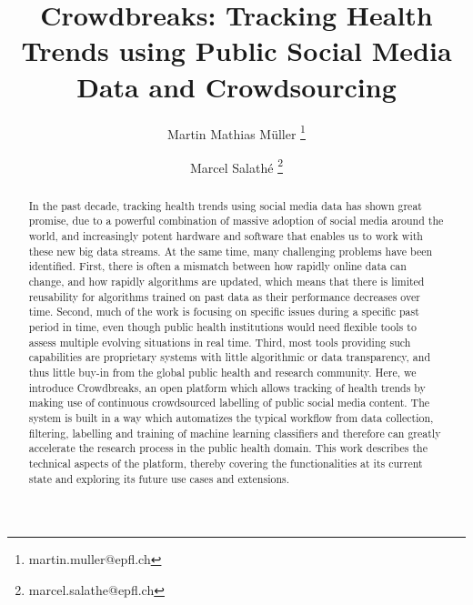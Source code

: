\documentclass[a4paper, 11pt]{article}
\begin{document}
\title{Crowdbreaks: Tracking Health Trends using Public Social Media Data and Crowdsourcing}
\author[1]{Martin Mathias M\"uller \footnote{martin.muller@epfl.ch}}
\author[1]{Marcel Salathé \footnote{marcel.salathe@epfl.ch}}



\maketitle
\linenumbers

\begin{abstract}
  In the past decade, tracking health trends using social media data has shown great promise, due to a powerful combination of massive adoption of social media around the world, and increasingly potent hardware and software that enables us to work with these new big data streams.
  At the same time, many challenging problems have been identified.
  First, there is often a mismatch between how rapidly online data can change, and how rapidly algorithms are updated, which means that there is limited reusability for algorithms trained on past data as their performance decreases over time.
  Second, much of the work is focusing on specific issues during a specific past period in time, even though public health institutions would need flexible tools to assess multiple evolving situations in real time.
  Third, most tools providing such capabilities are proprietary systems with little algorithmic or data transparency, and thus little buy-in from the global public health and research community. 
  Here, we introduce Crowdbreaks, an open platform which allows tracking of health trends by making use of continuous crowdsourced labelling of public social media content.
  The system is built in a way which automatizes the typical workflow from data collection, filtering, labelling and training of machine learning classifiers and therefore can greatly accelerate the research process in the public health domain.
  This work describes the technical aspects of the platform, thereby covering the functionalities at its current state and exploring its future use cases and extensions. 
\end{abstract}
\end{document}
